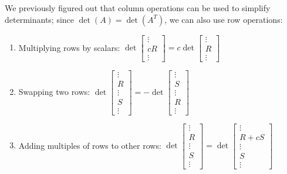 \begin{applicationActivities}{2}{26}
\begin{fact}
We previously figured out that column operations can be used to simplify
determinants; since \(\det(A)=\det(A^T)\), we can also use row operations:
\begin{enumerate}
\item Multiplying rows by scalars:
  \(\det\begin{bmatrix}\vdots\\cR\\\vdots\end{bmatrix}=
  c\det\begin{bmatrix}\vdots\\R\\\vdots\end{bmatrix}\)
\item Swapping two rows:
  \(\det\begin{bmatrix}\vdots\\R\\\vdots\\S\\\vdots\end{bmatrix}=
  -\det\begin{bmatrix}\vdots\\S\\\vdots\\R\\\vdots\end{bmatrix}\)
\item Adding multiples of rows to other rows:
  \(\det\begin{bmatrix}\vdots\\R\\\vdots\\S\\\vdots\end{bmatrix}=
  \det\begin{bmatrix}\vdots\\R+cS\\\vdots\\S\\\vdots\end{bmatrix}\)
\end{enumerate}
\end{fact}


\end{applicationActivities}
